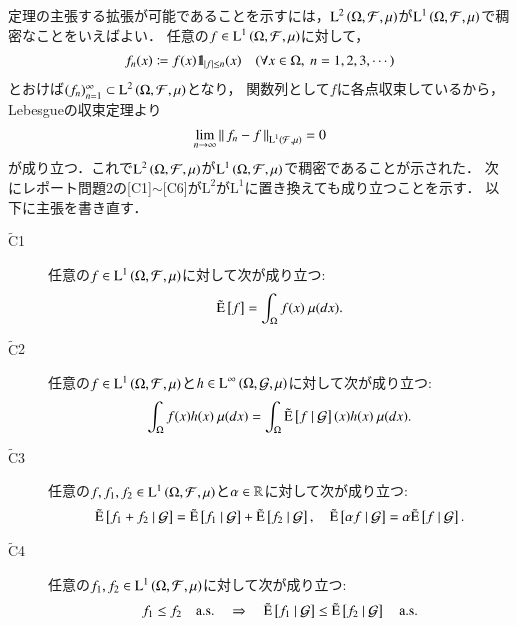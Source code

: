 	\begin{prf}	
		定理の主張する拡張が可能であることを示すには，$\operatorname{L}^{2} \left(\Omega,\mathcal{F},\mu\right)$が$\operatorname{L}^{1} \left(\Omega,\mathcal{F},\mu\right)$で稠密なことをいえばよい．
		任意の$f \in \operatorname{L}^{1} \left(\Omega,\mathcal{F},\mu\right)$に対して，
		\begin{align}
			f_n(x) \coloneqq f(x) \mbox{1}\hspace{-0.25em}\mbox{l}_{|f| \leq n} (x) \quad (\forall x \in \Omega,\ n=1,2,3,\cdots) \label{conditional_exp_expansion}
		\end{align}
		とおけば$(f_n)_{n=1}^{\infty} \subset \operatorname{L}^{2} \left(\Omega,\mathcal{F},\mu\right)$となり，
		関数列として$f$に各点収束しているから，Lebesgueの収束定理より
		\begin{align}
			\lim_{n \to \infty} \left\|\, f_n - f\, \right\|_{\operatorname{L}^{1} \left(\mathcal{F},\mu\right)} = 0
		\end{align}
		が成り立つ．これで$\operatorname{L}^{2} \left(\Omega,\mathcal{F},\mu\right)$が$\operatorname{L}^{1} \left(\Omega,\mathcal{F},\mu\right)$で稠密であることが示された．
		次にレポート問題2の[C1]$\sim$[C6]が$\mathrm{L}^2$が$\mathrm{L}^1$に置き換えても成り立つことを示す．
		以下に主張を書き直す．
		\begin{description}
			\item[$\tilde{\mathrm{C}}$1] 任意の$f \in \operatorname{L}^{1} \left(\Omega, \mathcal{F},\mu\right)$に対して次が成り立つ:
				\begin{align}
					\tilde{\operatorname{E}} \left[ f \right] = \int_{\Omega} f(x)\ \mu(dx).
				\end{align}
				
			\item[$\tilde{\mathrm{C}}$2]	任意の$f \in \operatorname{L}^{1} \left(\Omega, \mathcal{F},\mu\right)$と$h \in \operatorname{L}^{\infty} \left(\Omega, \mathcal{G},\mu\right)$に対して次が成り立つ:
				\begin{align}
					\int_{\Omega} f(x)h(x)\ \mu(dx) = \int_{\Omega} \tilde{\operatorname{E}} \left[ f \ \middle|\ \mathcal{G} \right](x)h(x)\ \mu(dx).
				\end{align}
				
			\item[$\tilde{\mathrm{C}}$3]	任意の$f,f_1,f_2 \in \operatorname{L}^{1} \left(\Omega, \mathcal{F},\mu\right)$と$\alpha \in \mathbb{R}$に対して次が成り立つ:
				\begin{align}
					\tilde{\operatorname{E}} \left[ f_1 + f_2 \ \middle|\ \mathcal{G} \right] = \tilde{\operatorname{E}} \left[ f_1 \ \middle|\ \mathcal{G} \right] + \tilde{\operatorname{E}} \left[ f_2 \ \middle|\ \mathcal{G} \right],
					\quad \tilde{\operatorname{E}} \left[ \alpha f \ \middle|\ \mathcal{G} \right] = \alpha \tilde{\operatorname{E}} \left[ f \ \middle|\ \mathcal{G} \right].
				\end{align}

			\item[$\tilde{\mathrm{C}}$4]	任意の$f_1,f_2 \in \operatorname{L}^{1} \left(\Omega, \mathcal{F},\mu\right)$に対して次が成り立つ:
				\begin{align}
					f_1 \leq f_2 \quad \mathrm{a.s.} \quad \Rightarrow \quad \tilde{\operatorname{E}} \left[ f_1 \ \middle|\ \mathcal{G} \right] \leq \tilde{\operatorname{E}} \left[ f_2 \ \middle|\ \mathcal{G} \right] \quad \mathrm{a.s.}
				\end{align}
			

\end{description}
\end{prf}
